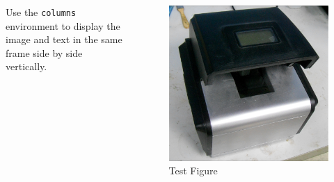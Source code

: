 \documentclass[
        handout,
        ]{beamer}
\begin{document}
\begin{frame}[t]{\subsecname} %
    \begin{columns}
        Use the \texttt{columns} environment to display the image and text in the same frame side by side vertically.
        \begin{figure}
        \centering
        \includegraphics[width=\textwidth]{im/testim}
        \caption{Test Figure}
        \end{figure}
    \end{columns}
\end{frame}
\end{document}
